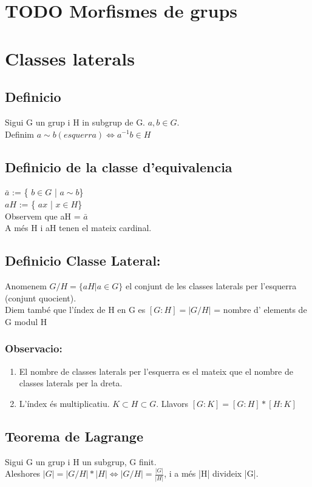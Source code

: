 \documentclass[11pt]{article}
\begin{document}
\section{{\bfseries\sffamily TODO} Morfismes de grups}
\label{sec:orga1cb53e}
\section{Classes laterals}
\label{sec:orgcc06de2}
\subsection{Definicio}
\label{sec:orge22c4b2}
Sigui G un grup i H in subgrup de G. \(a,b \in G\). \\
Definim \(a \sim b (esquerra) \iff a^{-1}b \in H\)
\subsection{Definicio de la classe d'equivalencia}
\label{sec:orgdbca37a}
\(\bar{a}\) := \{ \(b \in G\) | \(a \sim b\)\} \\
\(aH\) := \{ \(ax\) | \(x \in H\)\} \\
Observem que aH = \(\bar{a}\) \\
A més H i aH tenen el mateix cardinal.

\subsection{Definicio Classe Lateral:}
\label{sec:org4564883}
Anomenem \(G/H = \{aH | a \in G\}\) el conjunt de les classes laterals per l'esquerra (conjunt quocient). \\
Diem també que l'índex de H en G es \([G:H] = |G/H|\) = nombre d' elements de G modul H

\subsubsection{Observacio:}
\label{sec:org4d34938}
\begin{enumerate}
\item El nombre de classes laterals per l'esquerra es el mateix que el nombre de classes laterals per la dreta.
\item L'índex és multiplicatiu. \(K \subset H \subset G\). Llavors \([G:K] = [G:H] * [H:K]\)
\end{enumerate}

\subsection{Teorema de Lagrange}
\label{sec:org14f755e}
Sigui G un grup i H un subgrup, G finit. \\
Aleshores \(|G| = |G/H| * |H| \iff |G/H| = \frac{|G|}{|H|}\), i a més |H| divideix |G|.
\end{document}
